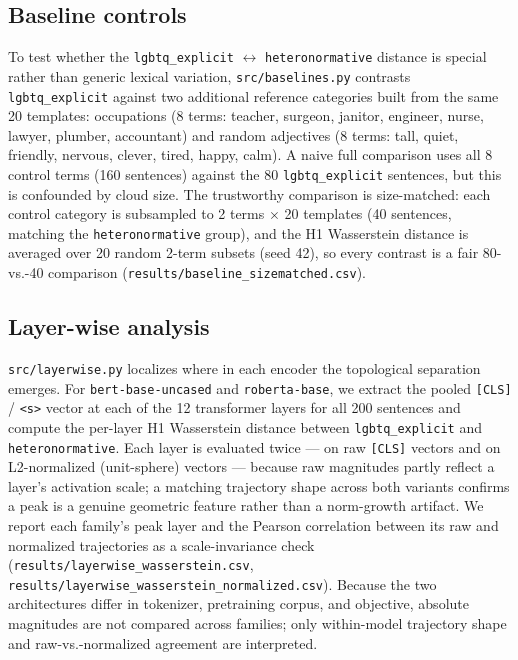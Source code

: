 \documentclass[11pt]{article}
\begin{document}
\subsection{Baseline controls}

To test whether the \texttt{lgbtq\_explicit} $\leftrightarrow$ \texttt{heteronormative} distance is special rather than generic lexical variation, \texttt{src/baselines.py} contrasts \texttt{lgbtq\_explicit} against two additional reference categories built from the same 20 templates: occupations (8 terms: teacher, surgeon, janitor, engineer, nurse, lawyer, plumber, accountant) and random adjectives (8 terms: tall, quiet, friendly, nervous, clever, tired, happy, calm). A naive full comparison uses all 8 control terms (160 sentences) against the 80 \texttt{lgbtq\_explicit} sentences, but this is confounded by cloud size. The trustworthy comparison is size-matched: each control category is subsampled to 2 terms $\times$ 20 templates (40 sentences, matching the \texttt{heteronormative} group), and the H1 Wasserstein distance is averaged over 20 random 2-term subsets (seed 42), so every contrast is a fair 80-vs.-40 comparison (\texttt{results/baseline\_sizematched.csv}).

\subsection{Layer-wise analysis}

\texttt{src/layerwise.py} localizes where in each encoder the topological separation emerges. For \texttt{bert-base-uncased} and \texttt{roberta-base}, we extract the pooled \texttt{[CLS]} / \texttt{<s>} vector at each of the 12 transformer layers for all 200 sentences and compute the per-layer H1 Wasserstein distance between \texttt{lgbtq\_explicit} and \texttt{heteronormative}. Each layer is evaluated twice --- on raw \texttt{[CLS]} vectors and on L2-normalized (unit-sphere) vectors --- because raw magnitudes partly reflect a layer's activation scale; a matching trajectory shape across both variants confirms a peak is a genuine geometric feature rather than a norm-growth artifact. We report each family's peak layer and the Pearson correlation between its raw and normalized trajectories as a scale-invariance check (\texttt{results/layerwise\_wasserstein.csv}, \texttt{results/layerwise\_wasserstein\_normalized.csv}). Because the two architectures differ in tokenizer, pretraining corpus, and objective, absolute magnitudes are not compared across families; only within-model trajectory shape and raw-vs.-normalized agreement are interpreted.
\end{document}

